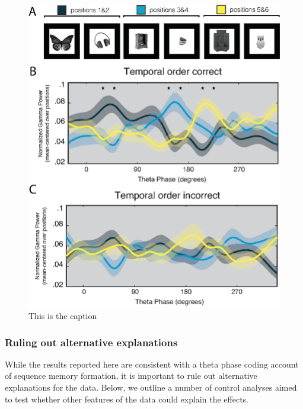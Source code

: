 \begin{figure}[htbp]
\centering
\includegraphics{figures/chapter3_figure3}
\caption{This is the caption}
\end{figure}

\subsubsection{Ruling out alternative
explanations}\label{ruling-out-alternative-explanations}

While the results reported here are consistent with a theta phase coding
account of sequence memory formation, it is important to rule out
alternative explanations for the data. Below, we outline a number of
control analyses aimed to test whether other features of the data could
explain the effects.

